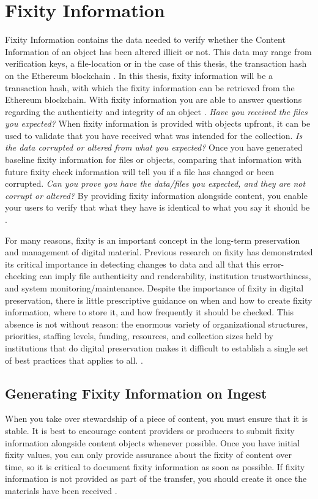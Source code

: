 \section{Fixity Information}
Fixity Information contains the data needed to verify whether the Content Information of an object has been altered illicit or not. This data may range from verification keys, a file-location or in the case of this thesis, the transaction hash on the Ethereum blockchain \cite[8]{lee2010open}. In this thesis, fixity information will be a transaction hash, with which the fixity information can be retrieved from the Ethereum blockchain.
With fixity information you are able to answer questions regarding the authenticity and integrity of an object \cite[3]{ndsa2017fixity}.
\newline \textit{Have you received the files you expected?} When fixity information is provided with objects upfront, it can be used to validate that you have received what was intended for the collection.
\newline \textit{Is the data corrupted or altered from what you expected?}  Once you have generated baseline fixity information for files or objects, comparing that information with future fixity check information will tell you if a file has changed or been corrupted.
\newline \textit{Can you prove you have the data/files you expected, and they are not corrupt or altered?} By providing fixity information alongside content, you enable your users to verify that what they have is identical to what you say it should be \cite[2]{ndsa2014fixity}. 

For many reasons, fixity is an important concept in the long-term preservation and management of digital material. Previous research on fixity has demonstrated its critical importance in detecting changes to data and all that this error-checking can imply file authenticity and renderability, institution trustworthiness, and system monitoring/maintenance. Despite the importance of fixity in digital preservation, there is little prescriptive guidance on when and how to create fixity information, where to store it, and how frequently it should be checked. This absence is not without reason: the enormous variety of organizational structures, priorities, staffing levels, funding, resources, and collection sizes held by institutions that do digital preservation makes it difficult to establish a single set of best practices that applies to all. \cite[38]{ndsa2017fixity}.
\subsection{Generating Fixity Information on Ingest}
When you take over stewardship of a piece of content, you must ensure that it is stable. It is best to encourage content providers or producers to submit fixity information alongside content objects whenever possible. Once you have initial fixity values, you can only provide assurance about the fixity of content over time, so it is critical to document fixity information as soon as possible. If fixity information is not provided as part of the transfer, you should create it once the materials have been received \cite[3]{ndsa2014fixity}.

